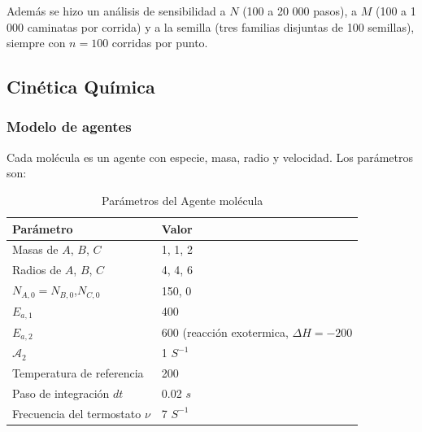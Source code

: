 \documentclass{article}
\begin{document}
Además se hizo un análisis de sensibilidad a $N$ (100 a 20 000 pasos), a $M$ (100 a 1 000 caminatas por corrida) y a la semilla (tres familias disjuntas de 100 semillas), siempre con $n=100$ corridas por punto.

\subsection{Cinética Química}

\subsubsection{Modelo de agentes}
Cada molécula es un agente con especie, masa, radio y velocidad. Los parámetros son: 

\begin{table}[h]
\centering
\renewcommand{\arraystretch}{1.3} 
\caption{Parámetros del Agente molécula}
\begin{tabularx}{\textwidth}{ | Y | Y | }
    \hline
    \textbf{Parámetro} & \textbf{Valor} \\
    \hline
    Masas de $A$, $B$, $C$ & 1, 1, 2  \\
    \hline
    Radios de $A$, $B$, $C$ & 4, 4, 6 \\
    \hline
    $N_{A,0} = N_{B, 0}$,$N_{C,0}$ & 150, 0  \\
    \hline
    $E_{a,1}$ & 400 \\
    \hline
    $E_{a,2}$ & 600 (reacción exotermica, $\Delta H=-200$ \\
    \hline
    $\mathcal{A}_2$ & 1 $S^{-1}$ \\
    \hline
    Temperatura de referencia & 200 \\
    \hline
    Paso de integración $dt$ & 0.02 $s$ \\
    \hline
    Frecuencia del termostato $\nu$ & 7 $S^{-1}$ \\
    \hline
\end{tabularx}
\end{table}
\end{document}
